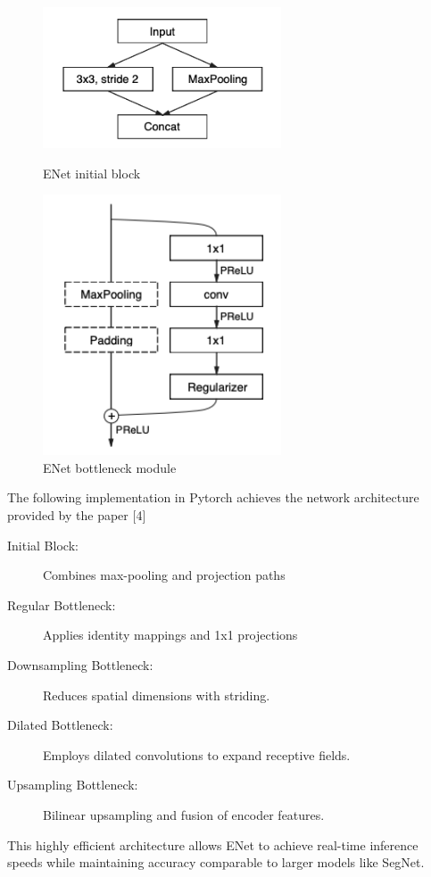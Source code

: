 \begin{figure}[H]
	\begin{minipage}[t]{7.2cm}
		\begin{center}
			\includegraphics[width=200pt]{assets/enet/first.png}
			\caption{ENet initial block}
			\label{fig:using:enetinit}
		\end{center}
	\end{minipage}
	\hfill
	\begin{minipage}[t]{7.2cm}
		\begin{center}
			\includegraphics[width=200pt]{assets/enet/second.png}
			\caption{ENet bottleneck module}
			\label{fig:using:enetbottle}
		\end{center}
	\end{minipage}
\end{figure}

The following implementation in Pytorch achieves the network architecture provided by the paper [4]
\begin{description}
	\item[Initial Block:] Combines max-pooling and projection paths
	\item[Regular Bottleneck:] Applies identity mappings and 1x1 projections
	\item[Downsampling Bottleneck:] Reduces spatial dimensions with striding.
	\item[Dilated Bottleneck:] Employs dilated convolutions to expand receptive fields.
	\item[Upsampling Bottleneck:] Bilinear upsampling and fusion of encoder features.
\end{description}
This highly efficient architecture allows ENet to achieve real-time inference speeds while maintaining accuracy comparable to larger models like SegNet.

